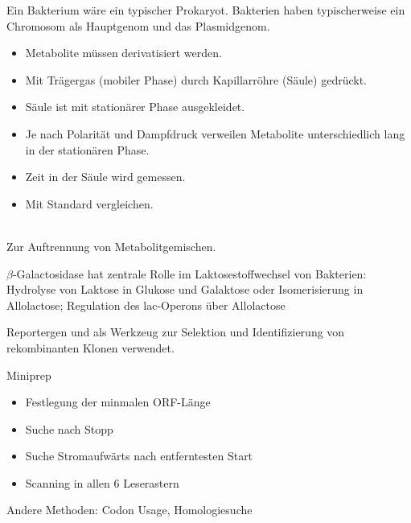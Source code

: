 Ein Bakterium wäre ein typischer Prokaryot. Bakterien haben typischerweise ein Chromosom als Hauptgenom und das Plasmidgenom.  \\ \newline

\begin{itemize}
    \item Metabolite müssen derivatisiert werden.
    \item Mit Trägergas (mobiler Phase) durch Kapillarröhre (Säule) gedrückt.
    \item Säule ist mit stationärer Phase ausgekleidet.
    \item Je nach Polarität und Dampfdruck verweilen Metabolite unterschiedlich lang in der stationären Phase.
    \item Zeit in der Säule wird gemessen.
    \item Mit Standard vergleichen.
\end{itemize} $\ $ \\

Zur Auftrennung von Metabolitgemischen. \\ \newline

$\beta$-Galactosidase hat zentrale Rolle im Laktosestoffwechsel von Bakterien: 
Hydrolyse von Laktose in Glukose und Galaktose oder Isomerisierung in Allolactose; Regulation des lac-Operons über Allolactose \\ \newline

Reportergen und als Werkzeug zur Selektion und Identifizierung von rekombinanten Klonen verwendet. \\ \newline

Miniprep \\ \newline

\begin{itemize}
    \item Festlegung der minmalen ORF-Länge 
\item Suche nach Stopp
\item Suche Stromaufwärts nach entferntesten Start
\item Scanning in allen 6 Leserastern
\end{itemize}
Andere Methoden:
Codon Usage, Homologiesuche \\ \newline

